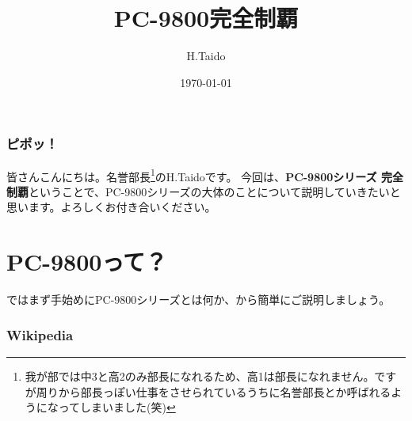 \documentclass[b5paper,9pt]{jsarticle}
\begin{document}
\title{PC-9800完全制覇}
\author{H.Taido}
\date{\today}
\maketitle
\thispagestyle{empty}

\begin{multicols*}{3}
  
\section*{ピポッ！}
皆さんこんにちは。名誉部長\footnote{我が部では中3と高2のみ部長になれるため、高1は部長になれません。ですが周りから部長っぽい仕事をさせられているうちに名誉部長とか呼ばれるようになってしまいました(笑)}のH.Taidoです。
今回は、{\bf PC-9800シリーズ 完全制覇}ということで、PC-9800シリーズの大体のことについて説明していきたいと思います。よろしくお付き合いください。
\part{PC-9800って？}
ではまず手始めにPC-9800シリーズとは何か、から簡単にご説明しましょう。
\section[short]{Wikipedia}

\end{multicols*}
\end{document}
